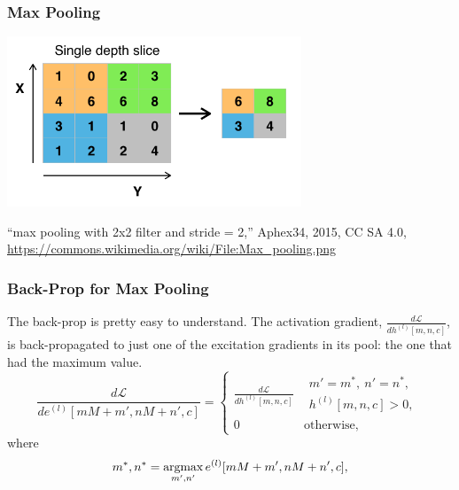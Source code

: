 \documentclass{beamer}
\newcommand{\argmax}{\operatornamewithlimits{argmax}}
\begin{document}
\begin{frame}
  \frametitle{Max Pooling}
  \centerline{\includegraphics[height=2in]{figs/Max_pooling.png}}
  \begin{tiny}
    ``max pooling with 2x2 filter and stride = 2,'' Aphex34, 2015, CC SA 4.0,
    \url{https://commons.wikimedia.org/wiki/File:Max_pooling.png}
  \end{tiny}
\end{frame}

\begin{frame}
  \frametitle{Back-Prop for Max Pooling}

  The back-prop is pretty easy to understand.  The activation gradient,
  $\frac{d{\mathcal L}}{dh^{(l)}[m,n,c]}$, is back-propagated to just one of
  the excitation gradients in its pool: the one that had the maximum value.
  \[
  \frac{d{\mathcal L}}{de^{(l)}[mM+m',nM+n',c]}=
  \begin{cases}
    \frac{d{\mathcal L}}{dh^{(l)}[m,n,c]} & \begin{array}{l}m'=m^*,~n'=n^*,\\h^{(l)}[m,n,c]>0,\end{array}\\
    0 & \mbox{otherwise},
  \end{cases}
  \]
  where
  \[
  m^*,n^* =\argmax_{m',n'} e^{(l)}[mM+m',nM+n',c],
  \]
\end{frame}
\end{document}
